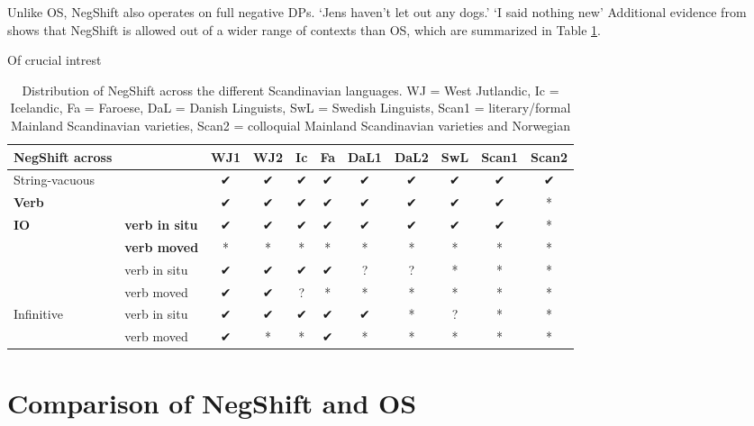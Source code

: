\documentclass[12pt, letterpaper]{article}
\begin{document}
\ex Unlike OS, NegShift also operates on full negative DPs.
			\glt `Jens haven't let out any dogs.'
			\glt `I said nothing new'
		\z
\ex Additional evidence from \citet{engelsScandinavianNegativeIndefinites2012} shows that NegShift is allowed out of a wider range of contexts than OS, which are summarized in Table \ref{tab:Distribution}.

\ex Of crucial intrest 
\begin{table}[!ht]
	\centering
	\caption{Distribution of NegShift across the different Scandinavian languages. WJ = West Jutlandic, Ic = Icelandic, Fa = Faroese, DaL = Danish Linguists, SwL = Swedish Linguists, Scan1 = literary/formal Mainland Scandinavian varieties, Scan2 = colloquial Mainland Scandinavian varieties and Norwegian}
	\label{tab:Distribution}
\begin{tabular}{llccccccccc}
	\hline 
	NegShift across &  & WJ1 & WJ2 & Ic & Fa & DaL1 & DaL2 & SwL & Scan1 & Scan2 \\ 
	\hline 
	String-vacuous &  & ✔︎ & ✔︎ & ✔︎ & ✔︎ & ✔︎ & ✔︎ & ✔︎ & ✔︎ & ✔︎ \\ 
	\textbf{Verb} &  & ✔︎ & ✔︎ & ✔︎ & ✔︎ & ✔︎ & ✔︎ & ✔︎ & ✔︎ & * \\ 
	\textbf{IO} & \textbf{verb in situ} & ✔︎ & ✔︎ & ✔︎ & ✔︎ & ✔︎ & ✔︎ & ✔︎ & ✔︎ & * \\ 
	& \textbf{verb moved} & * & * & * & * & * & * & * & * & * \\ }
	Preposition & verb in situ & ✔︎ & ✔︎ & ✔︎ & ✔︎ & ? & ? & * & * & * \\ 
	& verb moved & ✔︎ & ✔︎ & ? & * & * & * & * & * & * \\ 
	Infinitive & verb in situ & ✔︎ & ✔︎ & ✔︎ & ✔︎ & ✔︎ & * & ? & * & * \\ 
	& verb moved & ✔︎ & * & * & ✔︎ & * & * & * & * & * \\ 
	\hline 
\end{tabular} 
\end{table}
\z


\section{Comparison of NegShift and OS} \label{sec:Comparison}
\end{document}
